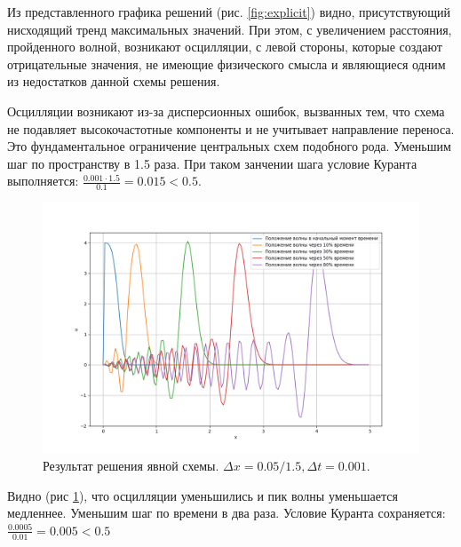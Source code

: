 Из представленного графика решений (рис. \ref{fig:explicit}) видно, присутствующий нисходящий тренд максимальных значений. При этом, с увеличением расстояния, пройденного волной, возникают осцилляции, с левой стороны, которые создают отрицательные значения, не имеющие физического смысла  и являющиеся одним из недостатков данной схемы решения.

Осцилляции возникают из-за дисперсионных ошибок, вызванных тем, что схема не подавляет высокочастотные компоненты и не учитывает направление переноса. Это фундаментальное ограничение центральных схем подобного рода.
\newpage
Уменьшим шаг по пространству в 1.5 раза. При таком занчении шага условие Куранта выполняется: $\frac{0.001 \cdot 1.5}{0.1} = 0.015< 0.5$.

\begin{figure}[h]  %
	\centering
	\includegraphics[height=0.7\textwidth]{imgs/explicit_1.5x.png}  %
	\caption{Результат решения явной схемы. $\Delta x = 0.05 / 1.5, \Delta t = 0.001$.}  %
	\label{fig:explicit_1.5x}  %
\end{figure}
Видно (рис \ref{fig:explicit_1.5x}), что осцилляции уменьшились и пик волны уменьшается медленнее.
\newpage
Уменьшим шаг по времени в два раза. Условие Куранта сохраняется: $\frac{0.0005}{0.01} = 0.005 < 0.5$
